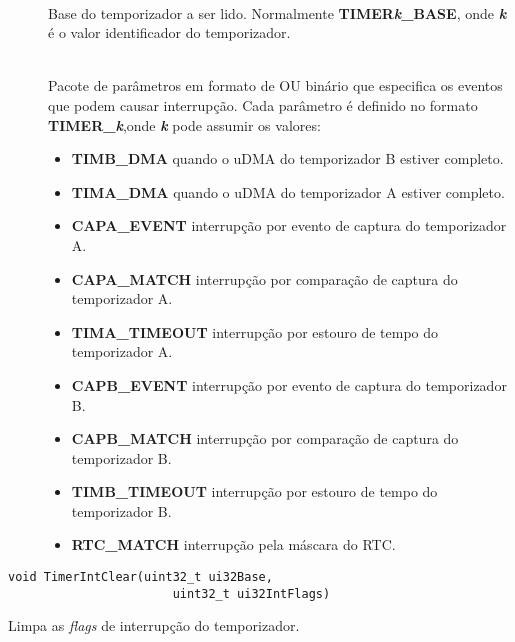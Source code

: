 \begin{description}
	\item []\hfill \\
	Base do temporizador a ser lido. Normalmente \textbf{TIMER\emph{k}\_BASE}, onde \textbf{\emph{k}} é o valor identificador do temporizador.
	
	\item []\hfill \\
	Pacote de parâmetros em formato de OU binário que especifica os eventos que podem causar interrupção. Cada parâmetro é definido no formato \textbf{TIMER\_\emph{k}},onde \textbf{\emph{k}} pode assumir os valores:
	\begin{itemize}
		\item \textbf{TIMB\_DMA} quando o uDMA do temporizador B estiver completo.
		\item \textbf{TIMA\_DMA} quando o uDMA do temporizador A estiver completo.
		\item \textbf{CAPA\_EVENT} interrupção por evento de captura do temporizador A.
		\item \textbf{CAPA\_MATCH} interrupção por comparação de captura do temporizador A.
		\item \textbf{TIMA\_TIMEOUT} interrupção por estouro de tempo do temporizador A.
		\item \textbf{CAPB\_EVENT} interrupção por evento de captura do temporizador B.
		\item \textbf{CAPB\_MATCH} interrupção por comparação de captura do temporizador B.
		\item \textbf{TIMB\_TIMEOUT} interrupção por estouro de tempo do temporizador B.
		\item \textbf{RTC\_MATCH} interrupção pela máscara do RTC.
	\end{itemize}
\end{description}

\begin{lstlisting}[style=funcao]
	void TimerIntClear(uint32_t ui32Base,
					   uint32_t ui32IntFlags)
\end{lstlisting}

Limpa as \emph{flags} de interrupção do temporizador.

